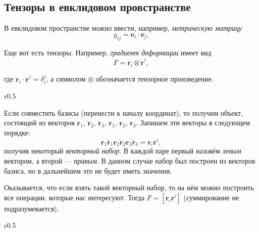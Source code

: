 \subsection{Тензоры в евклидовом провстранстве}
В евклидовом пространстве можно ввести, например, \emph{метрическую
матрицу}
\[
  g_{ij} = \mathbf{e}_i \cdot \mathbf{e}_j.
\]


Еще вот есть тензоры. Например, \emph{градиент деформации} имеет вид
\[
  F = \mathbf{r}_i \otimes \mathring{\mathbf{r}}^i,
\]

\begin{figure}[H]
	\centering
	
\end{figure}
где $\mathring{\mathbf{r}}_i \cdot \mathring{\mathbf{r}}^j = \delta_i^j$, а
символом
  $\otimes$ обозначается тензорное произведение.
  

\begin{wrapfigure}{r}{0.5\textwidth}
	\centering
	
\end{wrapfigure}

Если совместить базисы (перенести к началу координат), то получим объект, состоящий
из векторов $\mathring{\mathbf{r}}_1$, $\mathring{\mathbf{r}}_2$, $\mathring{\mathbf{r}}_3$, $\mathbf{r}_1$,
$\mathbf{r}_2$, $\mathbf{r}_3$. Запишем эти векторы в следующем порядке:
\[
  \mathbf{r}_1 \mathring{\mathbf{r}}_1 \mathbf{r}_2 \mathring{\mathbf{r}}_2 \mathbf{r}_3 \mathring{\mathbf{r}}_3 = \mathbf{r}_i \mathbf{r}^i,
\]
получив некоторый \emph{векторный набор}. В каждой паре первый назовём \emph{левым} вектором, а
второй --- \emph{правым}. В данном случае набор был построен из векторов базиса,
но в дальнейшем это не будет иметь значения.

%	

Оказывается, что если взять такой векторный набор, то на нём можно построить все операции, которые
нас интересуют. Тогда $F = [\mathbf{r}_i \mathbf{r}^i]$ (суммирование не подразумевается).

\begin{wrapfigure}{r}{0.5\textwidth}
	\centering
	
\end{wrapfigure}

